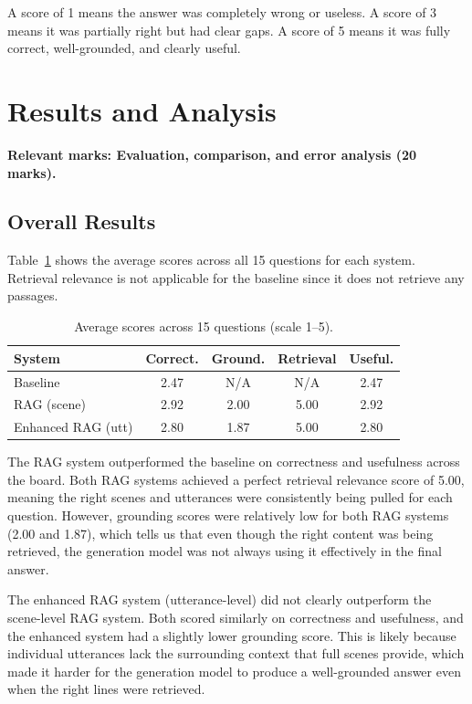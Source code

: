 \documentclass[10pt,conference]{IEEEtran}
\begin{document}
A score of 1 means the answer was completely wrong or useless. A
score of 3 means it was partially right but had clear gaps. A score
of 5 means it was fully correct, well-grounded, and clearly useful.

\section{Results and Analysis}
\label{sec:results}

\textbf{Relevant marks: Evaluation, comparison, and error analysis
(20 marks).}

\subsection{Overall Results}

Table~\ref{tab:results-summary} shows the average scores across all
15 questions for each system. Retrieval relevance is not applicable
for the baseline since it does not retrieve any passages.

\begin{table}[ht]
\centering
\caption{Average scores across 15 questions (scale 1--5).}
\label{tab:results-summary}
\begin{tabular}{lcccc}
\toprule
System & Correct. & Ground. & Retrieval & Useful. \\
\midrule
Baseline           & 2.47 & N/A  & N/A  & 2.47 \\
RAG (scene)        & 2.92 & 2.00 & 5.00 & 2.92 \\
Enhanced RAG (utt) & 2.80 & 1.87 & 5.00 & 2.80 \\
\bottomrule
\end{tabular}
\end{table}

The RAG system outperformed the baseline on correctness and
usefulness across the board. Both RAG systems achieved a perfect
retrieval relevance score of 5.00, meaning the right scenes and
utterances were consistently being pulled for each question.
However, grounding scores were relatively low for both RAG systems
(2.00 and 1.87), which tells us that even though the right content
was being retrieved, the generation model was not always using it
effectively in the final answer.

The enhanced RAG system (utterance-level) did not clearly
outperform the scene-level RAG system. Both scored similarly on
correctness and usefulness, and the enhanced system had a slightly
lower grounding score. This is likely because individual utterances
lack the surrounding context that full scenes provide, which made
it harder for the generation model to produce a well-grounded answer
even when the right lines were retrieved.
\end{document}
